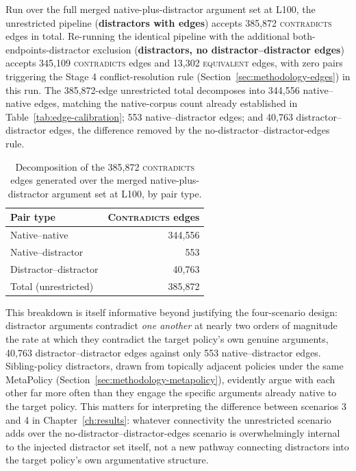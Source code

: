 Run over the full merged native-plus-distractor argument set at L100, the unrestricted pipeline
(\textbf{distractors with edges}) accepts 385,872 \textsc{contradicts} edges in total. Re-running
the identical pipeline with the additional both-endpoints-distractor exclusion
(\textbf{distractors, no distractor--distractor edges}) accepts 345,109 \textsc{contradicts} edges
and 13,302 \textsc{equivalent} edges, with zero pairs triggering the Stage 4 conflict-resolution
rule (Section~\ref{sec:methodology-edges}) in this run. The 385,872-edge unrestricted total
decomposes into 344,556 native--native edges, matching the native-corpus count already established
in Table~\ref{tab:edge-calibration}; 553 native--distractor edges; and 40,763
distractor--distractor edges, the difference removed by the no-distractor--distractor-edges rule.

\begin{table}[htbp]
\centering
\caption{Decomposition of the 385,872 \textsc{contradicts} edges generated over the merged
native-plus-distractor argument set at L100, by pair type.}
\label{tab:distractor-edge-breakdown}
\begin{tabular}{lr}
\toprule
\textbf{Pair type} & \textbf{\textsc{Contradicts} edges} \\
\midrule
Native--native & 344,556 \\
Native--distractor & 553 \\
Distractor--distractor & 40,763 \\
\midrule
Total (unrestricted) & 385,872 \\
\bottomrule
\end{tabular}
\end{table}

This breakdown is itself informative beyond justifying the four-scenario design: distractor
arguments contradict \emph{one another} at nearly two orders of magnitude the rate at which they
contradict the target policy's own genuine arguments, 40,763 distractor--distractor edges against
only 553 native--distractor edges. Sibling-policy distractors, drawn from topically adjacent
policies under the same MetaPolicy (Section~\ref{sec:methodology-metapolicy}), evidently argue
with each other far more often than they engage the specific arguments already native to the
target policy. This matters for interpreting the difference between scenarios 3 and 4 in
Chapter~\ref{ch:results}: whatever connectivity the unrestricted scenario adds over the
no-distractor--distractor-edges scenario is overwhelmingly internal to the injected distractor set
itself, not a new pathway connecting distractors into the target policy's own argumentative
structure.

